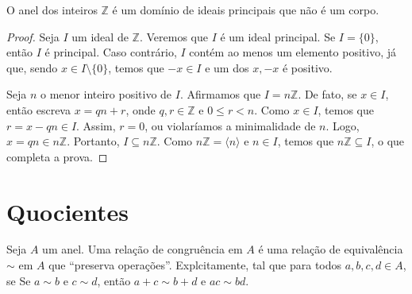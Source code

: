 \begin{prop} O anel dos inteiros $\mathbb Z$ é um domínio de ideais principais que não é um corpo.
\end{prop}
\begin{proof}
    Seja $I$ um ideal de $\mathbb Z$.
    Veremos que $I$ é um ideal principal.
    Se $I=\{0\}$, então $I$ é principal.
    Caso contrário, $I$ contém ao menos um elemento positivo, já que, sendo $x\in I\setminus\{0\}$, temos que $-x \in I$ e um dos $x, -x$ é positivo.

    Seja $n$ o menor inteiro positivo de $I$.
    Afirmamos que $I=n\mathbb Z$.
    De fato, se $x \in I$, então escreva $x=qn+r$, onde $q,r \in \mathbb Z$ e $0\leq r<n$.
    Como $x \in I$, temos que $r=x-qn \in I$. Assim, $r=0$, ou violaríamos a minimalidade de $n$.
    Logo, $x=qn\in n\mathbb Z$.
    Portanto, $I\subseteq n\mathbb Z$.
    Como $n\mathbb Z=\langle n\rangle$ e $n \in I$, temos que $n\mathbb Z\subseteq I$, o que completa a prova.
\end{proof}

\section{Quocientes}
\begin{definition}
    Seja $A$ um anel. Uma relação de congruência em $A$ é uma relação de equivalência $\sim$ em $A$ que ``preserva operações''. Explcitamente, tal que para todos $a, b, c, d \in A$, se Se $a\sim b$ e $c\sim d$, então $a+c\sim b+d$ e $ac\sim bd$.
\end{definition}

